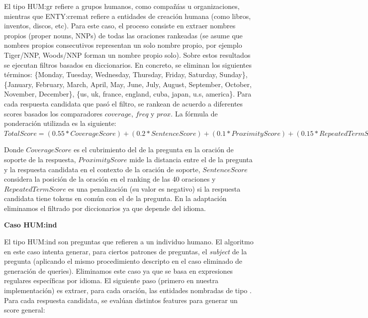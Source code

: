 El tipo HUM:gr refiere a grupos humanos, como compañías u organizaciones, mientras que ENTY:cremat refiere a entidades de creación humana (como libros, inventos, discos, etc).
Para este caso, el proceso consiste en extraer nombres propios (proper nouns, NNPs) de todas las oraciones rankeadas (se asume que nombres propios consecutivos representan un solo nombre propio, por ejemplo Tiger/NNP, Woods/NNP forman un nombre propio solo). Sobre estos resultados se ejecutan filtros basados en diccionarios. En concreto, se eliminan los siguientes términos: \{Monday, Tuesday, Wednesday, Thursday, Friday, Saturday, Sunday\}, \{January, February, March, April, May, June, July, August, September, October, November, December\}, \{us, uk, france, england, cuba, japan, u.s, america\}. Para cada respuesta candidata que pasó el filtro, se rankean de acuerdo a diferentes scores basados los comparadores $coverage$, $freq$ y $prox$.
La fórmula de ponderación utilizada es la siguiente: \\

$TotalScore = (0.55 * CoverageScore) + (0.2 * SentenceScore)	+ (0.1 * ProximityScore) + (0.15 * RepeatedTermScore)$

Donde $CoverageScore$ es el cubrimiento del  de la pregunta en la oración de soporte de la respuesta, $ProximityScore$ mide la distancia entre el  de la pregunta y la respuesta candidata en el contexto de la oración de soporte, $SentenceScore$ considera la posición de la oración en el ranking de las 40 oraciones y $RepeatedTermScore$ es una penalización (su valor es negativo) si la respuesta candidata tiene tokens en común con el  de la pregunta. En la adaptación eliminamos el filtrado por diccionarios ya que depende del idioma. \newline

\textbf{Caso HUM:ind} \newline

El tipo HUM:ind son preguntas que refieren a un individuo humano. El algoritmo en este caso intenta generar, para ciertos patrones de preguntas, el \textit{subject} de la pregunta (aplicando el mismo procedimiento descripto en el caso eliminado de generación de queries). Eliminamos este caso ya que se basa en expresiones regulares específicas por idioma.
El siguiente paso (primero en nuestra implementación) es extraer, para cada oración, las entidades nombradas de tipo . Para cada respuesta candidata, se evalúan distintos features para generar un score general:

